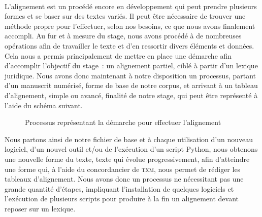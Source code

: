 
\paragraph{} L'alignement est un procédé encore en développement qui peut prendre plusieurs formes et se baser sur des textes variés. Il peut être nécessaire de trouver une méthode propre pour l'effectuer, selon nos besoins, ce que nous avons finalement accompli. Au fur et à mesure du stage, nous avons procédé à de nombreuses opérations afin de travailler le texte et d'en ressortir divers éléments et données. Cela nous a permis principalement de mettre en place une démarche afin d'accomplir l'objectif du stage~: un alignement partiel, ciblé à partir d'un lexique juridique. Nous avons donc maintenant à notre disposition un processus, partant d'un manuscrit numérisé, forme de base de notre corpus, et arrivant à un tableau d'alignement, simple ou avancé, finalité de notre stage, qui peut être représenté à l'aide du schéma suivant.
\begin{figure}[H]
    \centering
    \caption{Processus représentant la démarche pour effectuer l'alignement}
    \label{fig:processus_alignement}
\end{figure}
Nous partons ainsi de notre fichier de base et à chaque utilisation d'un nouveau logiciel, d'un nouvel outil et/ou de l'exécution d'un script Python, nous obtenons une nouvelle forme du texte, texte qui évolue progressivement, afin d'atteindre une forme qui, à l'aide du concordancier de \textsc{txm}, nous permet de rédiger les tableaux d'alignement. Nous avons donc un processus ne nécessitant pas une grande quantité d'étapes, impliquant l'installation de quelques logiciels et l'exécution de plusieurs scripts pour produire à la fin un alignement devant reposer sur un lexique. 

